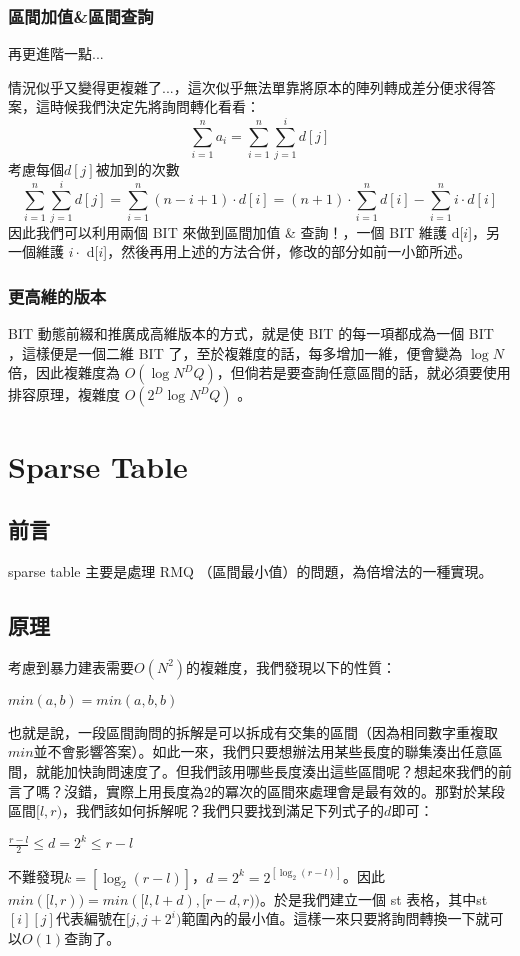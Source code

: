 	\subsection{區間加值\&區間查詢}
	再更進階一點...
\par 情況似乎又變得更複雜了...，這次似乎無法單靠將原本的陣列轉成差分便求得答案，這時候我們決定先將詢問轉化看看：
$$\sum_{i=1}^{n} a_i = \sum_{i=1}^{n}\sum_{j=1}^{i} d[j]$$
考慮每個$d[j]$被加到的次數
$$\sum_{i=1}^{n}\sum_{j=1}^{i} d[j] = \sum_{i=1}^{n} (n-i+1) \cdot d[i] = (n+1) \cdot \sum_{i=1}^{n} d[i] - \sum_{i=1}^{n} i \cdot d[i]$$
因此我們可以利用兩個 BIT 來做到區間加值 \& 查詢！，一個 BIT 維護 d[$i$]，另一個維護 $i \cdot$ d[$i$]，然後再用上述的方法合併，修改的部分如前一小節所述。
	\subsection{更高維的版本}
	BIT 動態前綴和推廣成高維版本的方式，就是使 BIT 的每一項都成為一個 BIT ，這樣便是一個二維 BIT 了，至於複雜度的話，每多增加一維，便會變為 $\log{N}$ 倍，因此複雜度為 $O(\log{N}^DQ)$，但倘若是要查詢任意區間的話，就必須要使用排容原理，複雜度 $O(2^D\log{N}^DQ)$ 。
	
\chapter{Sparse Table}
\section{前言}
sparse table 主要是處理 RMQ （區間最小值）的問題，為倍增法的一種實現。
\section{原理}
考慮到暴力建表需要$O(N^2)$的複雜度，我們發現以下的性質：
\begin{center}
$min(a,b)=min(a,b,b)$\\
\end{center}
也就是說，一段區間詢問的拆解是可以拆成有交集的區間（因為相同數字重複取$min$並不會影響答案）。如此一來，我們只要想辦法用某些長度的聯集湊出任意區間，就能加快詢問速度了。但我們該用哪些長度湊出這些區間呢？想起來我們的前言了嗎？沒錯，實際上用長度為$2$的冪次的區間來處理會是最有效的。那對於某段區間$[l,r)$，我們該如何拆解呢？我們只要找到滿足下列式子的$d$即可：
\begin{center}
$\frac{r-l}{2} \leq d=2^k\leq r-l$
\end{center}
不難發現$k=[\log _2 (r-l)]$，$d=2^k =2^[\log _2 (r-l)]$。因此$min([l,r))=min([l,l+d),[r-d,r))$。於是我們建立一個 st 表格，其中st$[i][j]$代表編號在$[j,j+2^i)$範圍內的最小值。這樣一來只要將詢問轉換一下就可以$O(1)$查詢了。
